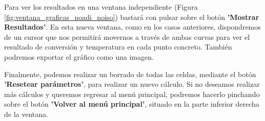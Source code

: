 Para ver los resultados en una ventana independiente (Figura \ref{fig:ventana_graficas_noadi_noiso}) bastará con pulsar sobre el botón \textbf{'Mostrar Resultados'}. En esta nueva ventana, como en los casos anteriores, dispondremos de un cursor que nos permitirá movernos a través de ambas curvas para ver el resultado de conversión y temperatura en cada punto concreto. También podremos exportar el gráfico como una imagen.

Finalmente, podemos realizar un borrado de todas las celdas, mediante el botón \textbf{'Resetear parámetros'}, para realizar un nuevo cálculo. Si no deseamos realizar más cálculos y queremos regresar al menú principal, podremos hacerlo pinchando sobre el botón \textbf{'Volver al menú principal'}, situado en la parte inferior derecha de la ventana.